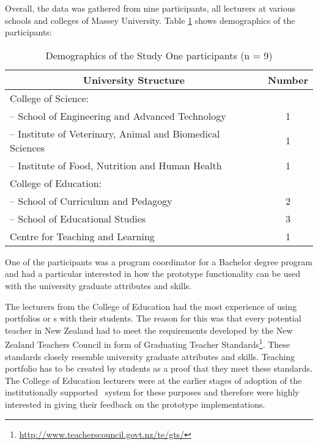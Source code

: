 Overall, the data was gathered from nine participants, all lecturers at
various schools and colleges of Massey University. Table \ref{tab:study1part}
shows demographics of the participants:

\begin{table}[htb]
\caption{Demographics of the Study One participants (n = 9)}
  \begin{center}
    \begin{tabular}{| l | c |}
    \hline
     \multicolumn{1}{|c|}{\textbf{University Structure}} &
     \multicolumn{1}{c|}{\textbf{Number}} \\ \hline
		College of Science: & \\ 
		-- School of Engineering and Advanced Technology & 1 \\
		-- Institute of Veterinary, Animal and Biomedical Sciences & 1 \\
		-- Institute of Food, Nutrition and Human Health & 1 \\ \hline
		College of Education: & \\ 
		-- School of Curriculum and Pedagogy & 2 \\
		-- School of Educational Studies &  3 \\ \hline
		Centre for Teaching and Learning & 1 \\ \hline
	\end{tabular}
  \end{center}
\label{tab:study1part}
\end{table}

One of the participants was a program coordinator for a Bachelor degree program
and had a particular interested in how the prototype functionality can be used
with the university graduate attributes and \LLLs skills.

The lecturers from the College of Education had the most experience of using
portfolios or \ep s with their students. The reason for this was that every
potential teacher in New Zealand had to meet the requirements developed by the
New Zealand Teachers Council in form of Graduating Teacher
Standards\footnote{\url{http://www.teacherscouncil.govt.nz/te/gts/}}. These
standards closely resemble university graduate attributes and \LLLs skills.
Teaching portfolio has to be created by students as a proof that they meet these
standards. The College of Education lecturers were at the earlier stages of
adoption of the institutionally supported \ep~system for these purposes and
therefore were highly interested in giving their feedback on the prototype
implementations.


